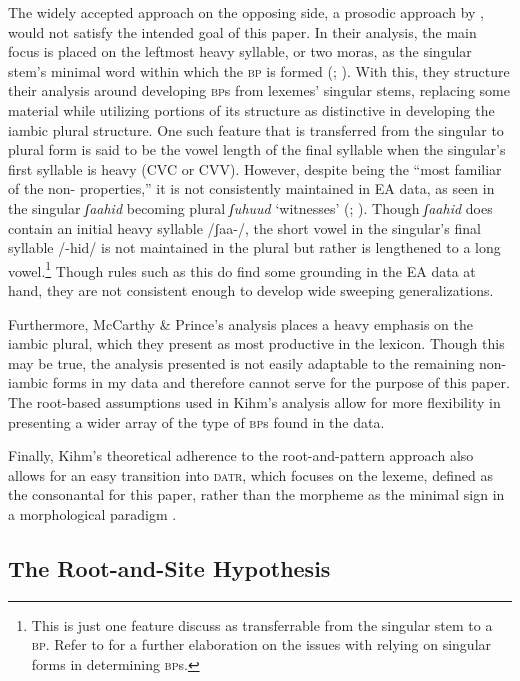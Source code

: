 \documentclass[output=paper,modfonts]{langscibook}
\begin{document}
The widely accepted approach on the opposing side, a prosodic approach by \citet{McCarthyPrince1990}, would not satisfy the intended goal of this paper. In their analysis, the main focus is placed on the leftmost heavy syllable, or two moras, as the singular stem’s minimal word within which the \textsc{bp} is formed (\citealt[80]{Ratcliffe1998}; \citealt[231]{McCarthyPrince1990}). With this, they structure their analysis around developing \textsc{bp}s from lexemes’ singular stems, replacing some material while utilizing portions of its structure as distinctive in developing the iambic plural structure. One such feature that is transferred from the singular to plural form is said to be the vowel length of the final syllable when the singular’s first syllable is heavy (CVC or CVV). However, despite being the “most familiar of the non- properties,” it is not consistently maintained in EA data, as seen in the singular \textit{ʃaahid} becoming plural \textit{ʃuhuud} ‘witnesses’ (\citealt[218]{McCarthyPrince1990}; \citealt[122]{Badawi1986}). Though\textit{ ʃaahid} does contain an initial heavy syllable /ʃaa-/, the short vowel in the singular’s final syllable /-hid/ is not maintained in the plural but rather is lengthened to a long vowel.\footnote{ This is just one feature \citet{McCarthyPrince1990} discuss as transferrable from the singular stem to a \textsc{bp}. Refer to \citet{Kihm2006} for a further elaboration on the issues with relying on singular forms in determining \textsc{bp}s.}  Though rules such as this do find some grounding in the EA data at hand, they are not consistent enough to develop wide sweeping generalizations. 

Furthermore, McCarthy \& Prince’s analysis places a heavy emphasis on the iambic plural, which they present as most productive in the  lexicon. Though this may be true, the analysis presented is not easily adaptable to the remaining non-iambic forms in my data and therefore cannot serve for the purpose of this paper. The root-based assumptions used in Kihm’s analysis allow for more flexibility in presenting a wider array of the type of \textsc{bp}s found in the data.

Finally, Kihm’s theoretical adherence to the root-and-pattern approach also allows for an easy transition into \textsc{datr}, which focuses on the lexeme, defined as the consonantal  for this paper, rather than the morpheme as the minimal sign in a morphological paradigm \citep[5]{BrownHippisley2012}.

\subsection{The Root-and-Site Hypothesis}
\end{document}
